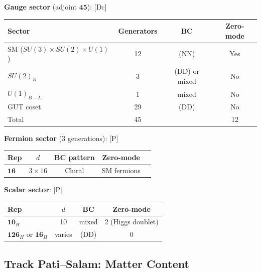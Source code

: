 \documentclass[11pt,a4paper]{article}
\newcommand{\tagDc}{\textcolor{blue!50!black}{[Dc]}}
\newcommand{\tagP}{\textcolor{green!50!black}{[P]}}
\begin{document}
\begin{trackbox}
\textbf{Gauge sector} (adjoint $\mathbf{45}$): \tagDc
\begin{center}
\begin{tabular}{lccc}
\toprule
Sector & Generators & BC & Zero-mode \\
\midrule
SM ($SU(3) \times SU(2) \times U(1)$) & 12 & (NN) & Yes \\
$SU(2)_R$ & 3 & (DD) or mixed & No \\
$U(1)_{B-L}$ & 1 & mixed & No \\
GUT coset & 29 & (DD) & No \\
\midrule
Total & 45 & & 12 \\
\bottomrule
\end{tabular}
\end{center}

\textbf{Fermion sector} (3 generations): \tagP
\begin{center}
\begin{tabular}{lcccc}
\toprule
Rep & $d$ & BC pattern & Zero-mode \\
\midrule
$\mathbf{16}$ & $3 \times 16$ & Chiral & SM fermions \\
\bottomrule
\end{tabular}
\end{center}

\textbf{Scalar sector}: \tagP
\begin{center}
\begin{tabular}{lccc}
\toprule
Rep & $d$ & BC & Zero-mode \\
\midrule
$\mathbf{10}_H$ & 10 & mixed & 2 (Higgs doublet) \\
$\mathbf{126}_H$ or $\mathbf{16}_H$ & varies & (DD) & 0 \\
\bottomrule
\end{tabular}
\end{center}

\end{trackbox}

\subsection{Track Pati--Salam: Matter Content}
\end{document}
